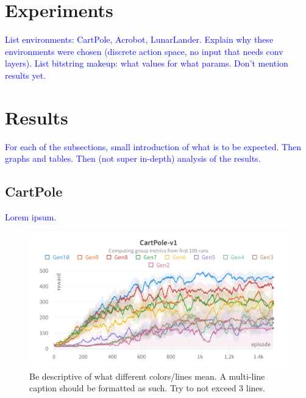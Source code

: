\documentclass{article}
\newcommand{\TODO}[1]{\textcolor{blue}{#1}}
\begin{document}
\section{Experiments}
\label{sec:exp}

\TODO{
    List environments: CartPole, Acrobot, LunarLander.
    Explain why these environments were chosen (discrete action space, no input that needs conv layers).
    List bitstring makeup: what values for what params.
    Don't mention results yet.
}

\section{Results}
\label{sec:res}

\TODO{
    For each of the subsections, small introduction of what is to be expected.
    Then graphs and tables.
    Then (not super in-depth) analysis of the results.
}

\subsection{CartPole}
\label{ssec:cp}

\TODO{Lorem ipsum.}

\begin{figure}[htbp]
    \centering
    \includegraphics[width=0.9\linewidth]{figs/lc-cp.png}
    \caption{
        Be descriptive of what different colors/lines mean.
        A multi-line caption should be formatted as such.
        Try to not exceed 3 lines.
    }
    \label{fig:lc-cp}
\end{figure}
\end{document}
